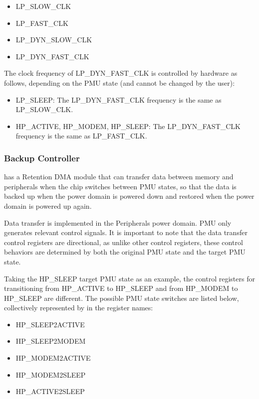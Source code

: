 \documentclass[main\_\_EN.tex]{subfiles}
\begin{document}
    \begin{itemize}
    \item LP\_SLOW\_CLK
    \item LP\_FAST\_CLK
    \item LP\_DYN\_SLOW\_CLK
    \item LP\_DYN\_FAST\_CLK
    \end{itemize}

The clock frequency of LP\_DYN\_FAST\_CLK is controlled by hardware as follows, depending on the PMU state (and cannot be changed by the user):

    \begin{itemize}
    \item LP\_SLEEP: The LP\_DYN\_FAST\_CLK frequency is the same as LP\_SLOW\_CLK.
    \item HP\_ACTIVE, HP\_MODEM, HP\_SLEEP: The LP\_DYN\_FAST\_CLK frequency is the same as LP\_FAST\_CLK.
    \end{itemize}

\subsubsection{Backup Controller}

\chipname{} has a Retention DMA module that can transfer data between memory and peripherals when the chip switches between PMU states, so that the data is backed up when the power domain is powered down and restored when the power domain is powered up again.

Data transfer is implemented in the Peripherals power domain. PMU only generates relevant control signals. It is important to note that the data transfer control registers are directional, as unlike other control registers, these control behaviors are determined by both the original PMU state and the target PMU state.

Taking the HP\_SLEEP target PMU state as an example, the control registers for transitioning from HP\_ACTIVE to HP\_SLEEP and from HP\_MODEM to HP\_SLEEP are different. The possible PMU state switches are listed below, collectively represented by  in the register names:

\begin{itemize}
    \item HP\_SLEEP2ACTIVE
    \item HP\_SLEEP2MODEM
    \item HP\_MODEM2ACTIVE
    \item HP\_MODEM2SLEEP
    \item HP\_ACTIVE2SLEEP
\end{itemize}
\end{document}
